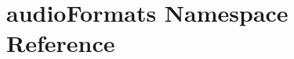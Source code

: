 \hypertarget{namespaceaudio_formats}{
\section{audioFormats Namespace Reference}
\label{namespaceaudio_formats}
}
